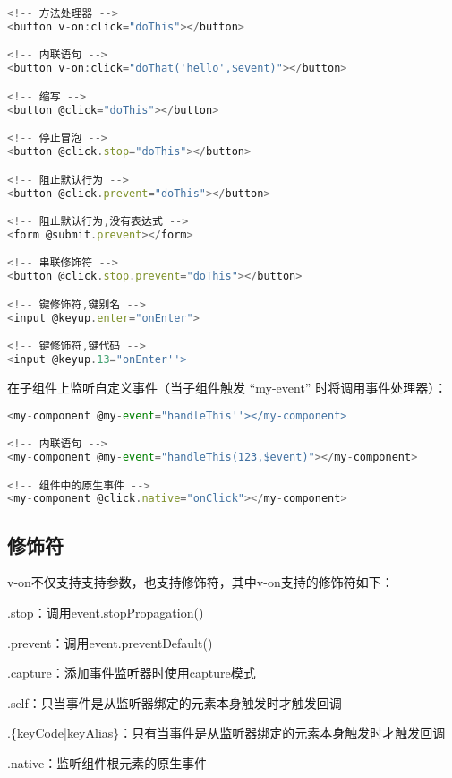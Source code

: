 \begin{lstlisting}[language=JavaScript]
<!-- 方法处理器 -->
<button v-on:click="doThis"></button>

<!-- 内联语句 -->
<button v-on:click="doThat('hello',$event)"></button>

<!-- 缩写 -->
<button @click="doThis"></button>

<!-- 停止冒泡 -->
<button @click.stop="doThis"></button>

<!-- 阻止默认行为 -->
<button @click.prevent="doThis"></button>

<!-- 阻止默认行为,没有表达式 -->
<form @submit.prevent></form>

<!-- 串联修饰符 -->
<button @click.stop.prevent="doThis"></button>

<!-- 键修饰符,键别名 -->
<input @keyup.enter="onEnter">

<!-- 键修饰符,键代码 -->
<input @keyup.13="onEnter''>
\end{lstlisting}

在子组件上监听自定义事件（当子组件触发 “my-event” 时将调用事件处理器）：

\begin{lstlisting}[language=JavaScript]
<my-component @my-event="handleThis''></my-component>

<!-- 内联语句 -->
<my-component @my-event="handleThis(123,$event)"></my-component>

<!-- 组件中的原生事件 -->
<my-component @click.native="onClick"></my-component>
\end{lstlisting}


\subsection{修饰符}


v-on不仅支持支持参数，也支持修饰符，其中v-on支持的修饰符如下：


\begin{compactitem}
\item .stop：调用event.stopPropagation()
\item .prevent：调用event.preventDefault()
\item .capture：添加事件监听器时使用capture模式
\item .self：只当事件是从监听器绑定的元素本身触发时才触发回调
\item .\{keyCode|keyAlias\}：只有当事件是从监听器绑定的元素本身触发时才触发回调
\item .native：监听组件根元素的原生事件
\end{compactitem}

